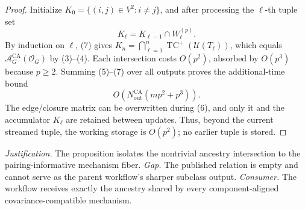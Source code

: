 \documentclass{article}
\begin{document}
\begin{proof}
Initialize \(K_0=\{(i,j)\in V^2:i\ne j\}\), and after processing the
\(\ell\)-th tuple set
\[
 K_\ell=K_{\ell-1}\cap W_\ell^{(p)}.
 \tag{7}
\]
By induction on \(\ell\), (7) gives
\(K_n=\bigcap_{\ell=1}^n
\operatorname{TC}^{+}(\mathcal U(T_\ell))\), which equals
\(\mathcal A_G^{\mathrm{CA}}(\mathcal O_G)\) by (3)--(4).  Each intersection
costs \(O(p^2)\), absorbed by \(O(p^3)\) because \(p\geq2\).  Summing (5)--(7)
over all outputs proves the additional-time bound
\[
 O\!\left(N_{\mathrm{out}}^{\mathrm{CA}}(mp^2+p^3)\right).
\]
The edge/closure matrix can be overwritten during (6), and only it and the
accumulator \(K_\ell\) are retained between updates.  Thus, beyond the current
streamed tuple, the working storage is \(O(p^2)\); no earlier tuple is stored.
\end{proof}
\par\smallskip\noindent \textit{Justification.} The proposition isolates the nontrivial ancestry intersection to the pairing-informative mechanism fiber. \textit{Gap.} The published relation is empty and cannot serve as the parent workflow's sharper subclass output. \textit{Consumer.} The workflow receives exactly the ancestry shared by every component-aligned covariance-compatible mechanism.
\end{document}
